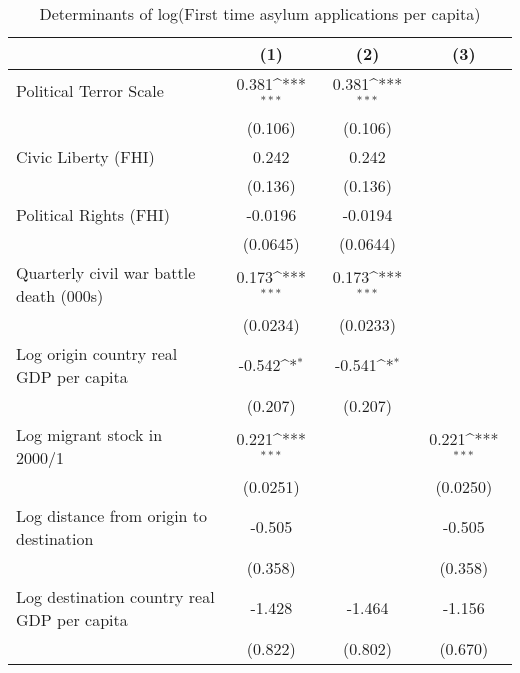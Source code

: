 \begin{table}[htbp]\centering
\def\sym#1{\ifmmode^{#1}\else\(^{#1}\)\fi}
\caption{Determinants of log(First time asylum applications per capita)}
\begin{tabular}{l*{3}{c}}
\hline\hline
                    &\multicolumn{1}{c}{(1)}         &\multicolumn{1}{c}{(2)}         &\multicolumn{1}{c}{(3)}         \\
\hline
Political Terror Scale&       0.381\sym{***}&       0.381\sym{***}&                     \\
                    &     (0.106)         &     (0.106)         &                     \\
[1em]
Civic Liberty (FHI) &       0.242         &       0.242         &                     \\
                    &     (0.136)         &     (0.136)         &                     \\
[1em]
Political Rights (FHI)&     -0.0196         &     -0.0194         &                     \\
                    &    (0.0645)         &    (0.0644)         &                     \\
[1em]
Quarterly civil war battle death (000s)&       0.173\sym{***}&       0.173\sym{***}&                     \\
                    &    (0.0234)         &    (0.0233)         &                     \\
[1em]
Log origin country real GDP per capita&      -0.542\sym{*}  &      -0.541\sym{*}  &                     \\
                    &     (0.207)         &     (0.207)         &                     \\
[1em]
Log migrant stock in 2000/1&       0.221\sym{***}&                     &       0.221\sym{***}\\
                    &    (0.0251)         &                     &    (0.0250)         \\
[1em]
Log distance from origin to destination&      -0.505         &                     &      -0.505         \\
                    &     (0.358)         &                     &     (0.358)         \\
[1em]
Log destination country real GDP per capita&      -1.428         &      -1.464         &      -1.156         \\
                    &     (0.822)         &     (0.802)         &     (0.670)         \\

\end{tabular}
\end{table}
